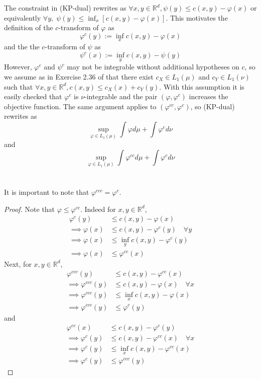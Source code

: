 \documentclass{article}
\theoremstyle{definition}
\theoremstyle{remark}
\begin{document}
The constraint in (KP-dual) rewrites as $\forall x,y \in \mathbb R^d, \psi(y)\leq c(x,y) - \varphi(x)$ or equivalently \newline $\forall y,\; \psi(y) \leq \inf_x [c(x,y) - \varphi(x)]$. This motivates the definition of the $c$-transform of $\varphi$ as $$\varphi^c(y):= \inf_x  c(x,y) - \varphi(x)$$ and the the $c$-transform of $\psi$ as $$\psi^c(x):= \inf_y  c(x,y) - \psi(y)$$ However, $\varphi^c$ and $\psi^c$ may not be integrable without additional hypotheses on $c$, so we assume as in Exercise 2.36 of \cite{villani2003topics} that there exist $c_X\in L_1(\mu)$ and $c_Y\in L_1(\nu)$ such that $\forall x,y \in \mathbb R^d, c(x,y)\leq c_X(x) + c_Y(y)$. With this assumption it is easily checked that $\varphi^c$ is $\nu$-integrable and the pair $(\varphi, \varphi^c)$ increases the objective function. The same argument applies to $(\varphi^{cc}, \varphi^c)$, so (KP-dual) rewrites as 
\begin{equation}\tag{KP-dual 2}
\sup_{\varphi \in L_1(\mu)} \int \varphi d\mu + \int \varphi^c d\nu
\end{equation}
and 
\begin{equation}\tag{KP-dual 3}
\sup_{\varphi \in L_1(\mu)} \int \varphi^{cc} d\mu + \int \varphi^c d\nu
\end{equation}
\\ \\
It is important to note that $\varphi^{ccc}=\varphi^c$. 
\begin{proof}
Note that $\varphi\leq \varphi^{cc}$. Indeed for $x,y\in \mathbb R^d$, $$\begin{aligned}
\varphi^c(y) &\leq c(x,y) - \varphi(x)\\
\implies \varphi(x) &\leq c(x,y) - \varphi^c(y) \quad \forall y\\
\implies \varphi(x) &\leq \inf _y c(x,y) - \varphi^c(y)\\
\implies \varphi(x) &\leq \varphi^{cc}(x)
\end{aligned}$$
Next, for $x,y\in \mathbb R^d$,
$$\begin{aligned}
\varphi^{ccc}(y) &\leq c(x,y) - \varphi^{cc}(x)\\
\implies \varphi^{ccc}(y) &\leq c(x,y) - \varphi(x) \quad \forall x\\
\implies \varphi^{ccc}(y) &\leq \inf_x c(x,y) - \varphi(x)\\
\implies \varphi^{ccc}(y) &\leq \varphi^c(y)
\end{aligned}$$
and 
$$\begin{aligned}
\varphi^{cc}(x) &\leq c(x,y) - \varphi^{c}(y)\\
\implies \varphi^{c}(y) &\leq c(x,y) - \varphi^{cc}(x) \quad \forall x\\
\implies \varphi^{c}(y) &\leq \inf_x c(x,y) - \varphi^{cc}(x)\\
\implies \varphi^{c}(y) &\leq \varphi^{ccc}(y)
\end{aligned}$$
\end{proof}
\end{document}
